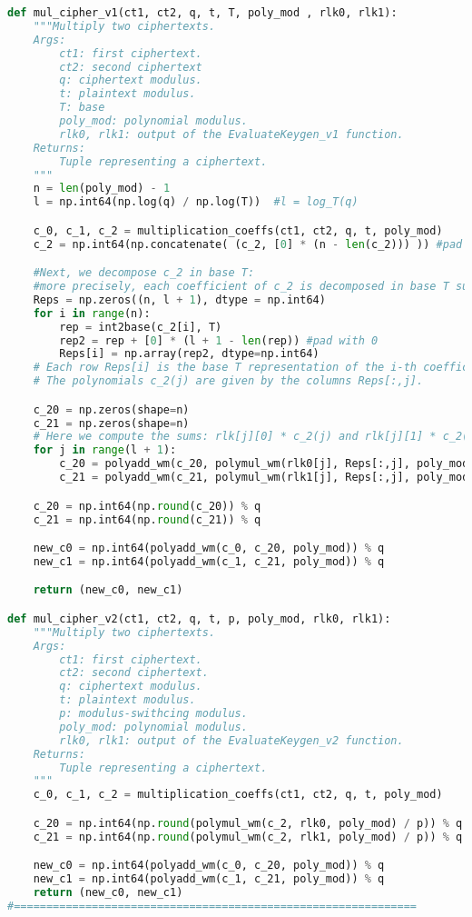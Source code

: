 \documentclass{article}
\begin{document}
\begin{lstlisting}[language=Python]
def mul_cipher_v1(ct1, ct2, q, t, T, poly_mod , rlk0, rlk1):
    """Multiply two ciphertexts.
    Args:
        ct1: first ciphertext.
        ct2: second ciphertext
        q: ciphertext modulus.
        t: plaintext modulus.
        T: base
        poly_mod: polynomial modulus.
        rlk0, rlk1: output of the EvaluateKeygen_v1 function.
    Returns:
        Tuple representing a ciphertext.
    """
    n = len(poly_mod) - 1
    l = np.int64(np.log(q) / np.log(T))  #l = log_T(q)

    c_0, c_1, c_2 = multiplication_coeffs(ct1, ct2, q, t, poly_mod)
    c_2 = np.int64(np.concatenate( (c_2, [0] * (n - len(c_2))) )) #pad

    #Next, we decompose c_2 in base T:
    #more precisely, each coefficient of c_2 is decomposed in base T such that c_2 = sum T**i * c_2(i).
    Reps = np.zeros((n, l + 1), dtype = np.int64)
    for i in range(n):
        rep = int2base(c_2[i], T)
        rep2 = rep + [0] * (l + 1 - len(rep)) #pad with 0
        Reps[i] = np.array(rep2, dtype=np.int64)
    # Each row Reps[i] is the base T representation of the i-th coefficient c_2[i].
    # The polynomials c_2(j) are given by the columns Reps[:,j].

    c_20 = np.zeros(shape=n)
    c_21 = np.zeros(shape=n)
    # Here we compute the sums: rlk[j][0] * c_2(j) and rlk[j][1] * c_2(j)
    for j in range(l + 1):
        c_20 = polyadd_wm(c_20, polymul_wm(rlk0[j], Reps[:,j], poly_mod), poly_mod)
        c_21 = polyadd_wm(c_21, polymul_wm(rlk1[j], Reps[:,j], poly_mod), poly_mod)

    c_20 = np.int64(np.round(c_20)) % q
    c_21 = np.int64(np.round(c_21)) % q

    new_c0 = np.int64(polyadd_wm(c_0, c_20, poly_mod)) % q
    new_c1 = np.int64(polyadd_wm(c_1, c_21, poly_mod)) % q

    return (new_c0, new_c1)

def mul_cipher_v2(ct1, ct2, q, t, p, poly_mod, rlk0, rlk1):
    """Multiply two ciphertexts.
    Args:
        ct1: first ciphertext.
        ct2: second ciphertext.
        q: ciphertext modulus.
        t: plaintext modulus.
        p: modulus-swithcing modulus.
        poly_mod: polynomial modulus.
        rlk0, rlk1: output of the EvaluateKeygen_v2 function.
    Returns:
        Tuple representing a ciphertext.
    """
    c_0, c_1, c_2 = multiplication_coeffs(ct1, ct2, q, t, poly_mod)

    c_20 = np.int64(np.round(polymul_wm(c_2, rlk0, poly_mod) / p)) % q
    c_21 = np.int64(np.round(polymul_wm(c_2, rlk1, poly_mod) / p)) % q

    new_c0 = np.int64(polyadd_wm(c_0, c_20, poly_mod)) % q
    new_c1 = np.int64(polyadd_wm(c_1, c_21, poly_mod)) % q
    return (new_c0, new_c1)
#==============================================================
\end{lstlisting}
\end{document}
